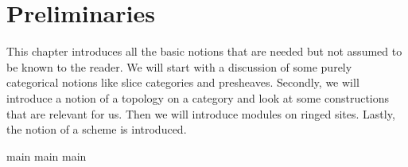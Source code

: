\chapter{Preliminaries}
This chapter introduces all the basic notions that are needed but not assumed to be known to the reader.
We will start with a discussion of some purely categorical notions like slice categories and presheaves.
Secondly, we will introduce a notion of a topology on a category and look at some constructions that are relevant for us.
Then we will introduce modules on ringed sites.
Lastly, the notion of a scheme is introduced.

{main}
{main}
{main}
